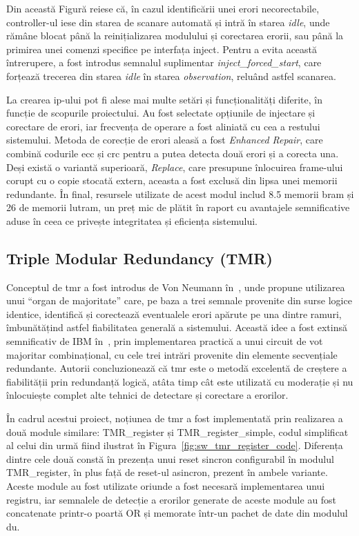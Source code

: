 \documentclass[12pt,a4paper]{report}
\begin{document}
Din această Figură reiese că, în cazul identificării unei erori necorectabile, controller-ul iese din starea de scanare automată și intră în starea \textit{idle}, unde rămâne blocat până la reinițializarea modulului și corectarea erorii, sau până la primirea unei comenzi specifice pe interfața inject. Pentru a evita această întrerupere, a fost introdus semnalul suplimentar \textit{inject\_forced\_start}, care forțează trecerea din starea \textit{idle} în starea \textit{observation}, reluând astfel scanarea. 

La crearea \gls{ip}-ului pot fi alese mai multe setări și funcționalități diferite, în funcție de scopurile proiectului. Au fost selectate opțiunile de injectare și corectare de erori, iar frecvența de operare a fost aliniată cu cea a restului sistemului. Metoda de corecție de erori aleasă a fost \textit{Enhanced Repair}, care combină codurile \gls{ecc} și \gls{crc} pentru a putea detecta două erori și a corecta una. Deși există o variantă superioară, \textit{Replace}, care presupune înlocuirea frame-ului corupt cu o copie stocată extern, aceasta a fost exclusă din lipsa unei memorii redundante. În final, resursele utilizate de acest modul includ 8.5 memorii \gls{bram} și 26 de memorii \gls{lutram}, un preț mic de plătit în raport cu avantajele semnificative aduse în ceea ce privește integritatea și eficiența sistemului.

\subsection{Triple Modular Redundancy (TMR)}%
\label{tmr}
Conceptul de \gls{tmr} a fost introdus de Von Neumann în~\cite{neumann_book_tmr}, unde propune utilizarea unui \enquote{organ de majoritate} care, pe baza a trei semnale provenite din surse logice identice, identifică și corectează eventualele erori apărute pe una dintre ramuri, îmbunătățind astfel fiabilitatea generală a sistemului. Această idee a fost extinsă semnificativ de IBM în~\cite{ibm_paper_tmr}, prin implementarea practică a unui circuit de vot majoritar combinațional, cu cele trei intrări provenite din elemente secvențiale redundante. Autorii concluzionează că \gls{tmr} este o metodă excelentă de creștere a fiabilității prin redundanță logică, atâta timp cât este utilizată cu moderație și nu înlocuiește complet alte tehnici de detectare și corectare a erorilor.

În cadrul acestui proiect, noțiunea de \gls{tmr} a fost implementată prin realizarea a două module similare: TMR\_register și TMR\_register\_simple, codul simplificat al celui din urmă fiind ilustrat în Figura~\ref{fig:sw_tmr_register_code}. Diferența dintre cele două constă în prezența unui reset sincron configurabil în modulul TMR\_register, în plus față de reset-ul asincron, prezent în ambele variante. Aceste module au fost utilizate oriunde a fost necesară implementarea unui registru, iar semnalele de detecție a erorilor generate de aceste module au fost concatenate printr-o poartă OR și memorate într-un pachet de date din modulul \gls{du}.
\end{document}
